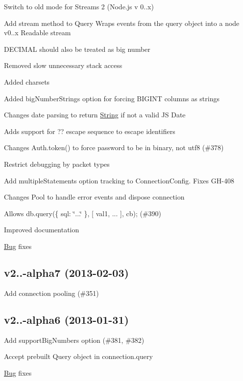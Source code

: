 \begin{DoxyItemize}
\item Switch to old mode for Streams 2 (Node.\+js v 0..\+x)
\item Add stream method to Query Wraps events from the query object into a node v0..\+x Readable stream
\item D\+E\+C\+I\+M\+A\+L should also be treated as big number
\item Removed slow unnecessary stack access
\item Added charsets
\item Added big\+Number\+Strings option for forcing B\+I\+G\+I\+N\+T columns as strings
\item Changes date parsing to return \hyperlink{class_string}{String} if not a valid J\+S Date
\item Adds support for ?? escape sequence to escape identifiers
\item Changes Auth.\+token() to force password to be in binary, not utf8 (\#378)
\item Restrict debugging by packet types
\item Add \textquotesingle{}multiple\+Statements\textquotesingle{} option tracking to Connection\+Config. Fixes G\+H-\/408
\item Changes Pool to handle \textquotesingle{}error\textquotesingle{} events and dispose connection
\item Allows db.\+query(\{ sql\+: \char`\"{}...\char`\"{} \}, \mbox{[} val1, ... \mbox{]}, cb); (\#390)
\item Improved documentation
\item \hyperlink{class_bug}{Bug} fixes
\end{DoxyItemize}

\subsection*{v2..-\/alpha7 (2013-\/02-\/03)}


\begin{DoxyItemize}
\item Add connection pooling (\#351)
\end{DoxyItemize}

\subsection*{v2..-\/alpha6 (2013-\/01-\/31)}


\begin{DoxyItemize}
\item Add support\+Big\+Numbers option (\#381, \#382)
\item Accept prebuilt Query object in connection.\+query
\item \hyperlink{class_bug}{Bug} fixes
\end{DoxyItemize}

